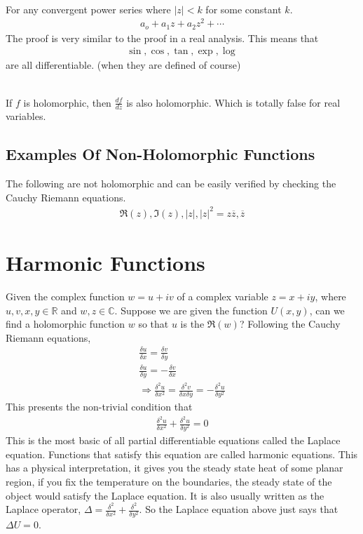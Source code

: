 \documentclass{article}
\begin{document}
\noindent \\ For any convergent power series where $|z| < k$ for some constant $k$.
\begin{gather*}
	a_o + a_1 z + a_2 z^2 + \cdots
\end{gather*}
The proof is very similar to the proof in a real analysis. This means that
\begin{gather*}
	\sin, \cos, \tan, \exp, \log
\end{gather*}
are all differentiable. (when they are defined of course)

\noindent \\ If $f$ is holomorphic, then $\frac{df}{dz}$ is also holomorphic. Which is totally false
for real variables.

\subsection{Examples Of Non-Holomorphic Functions}
The following are not holomorphic and can be easily verified by checking the Cauchy Riemann equations.
\begin{gather*}
	\Re(z), \Im(z), |z|, |z|^2 = z\overline{z}, \overline{z}
\end{gather*}

\section{Harmonic Functions}
Given the complex function $w = u + i v$ of a complex variable $z = x + i y$, where $u,v,x,y \in
	\mathbb{R}$ and $w,z \in \mathbb{C}$. Suppose we are given the function $U(x,y)$, can we find a
holomorphic function $w$ so that $u$ is the $\Re(w)$? Following the Cauchy Riemann equations,
\begin{gather*}
	\frac{\delta u}{\delta x} = \frac{\delta v}{\delta y} \\
	\frac{\delta u}{\delta y} = -\frac{\delta v}{\delta x} \\
	\Rightarrow \frac{\delta^2 u}{\delta x^2} = \frac{\delta^2 v}{\delta x \delta y}
	= -\frac{\delta^2 u}{\delta y^2}
\end{gather*}
This presents the non-trivial condition that
\begin{gather*}
	\frac{\delta^2 u}{\delta x^2} + \frac{\delta^2 u}{\delta y^2} = 0
\end{gather*}
This is the most basic of all partial differentiable equations called the Laplace equation. Functions
that satisfy this equation are called harmonic equations. This has a physical interpretation, it gives
you the steady state heat of some planar region, if you fix the temperature on the boundaries, the steady
state of the object would satisfy the Laplace equation. It is also usually written as the Laplace
operator, $\Delta = \frac{\delta^2}{\delta x^2} + \frac{\delta^2}{\delta y^2}$. So the Laplace equation
above just says that $\Delta U = 0$.
\end{document}
